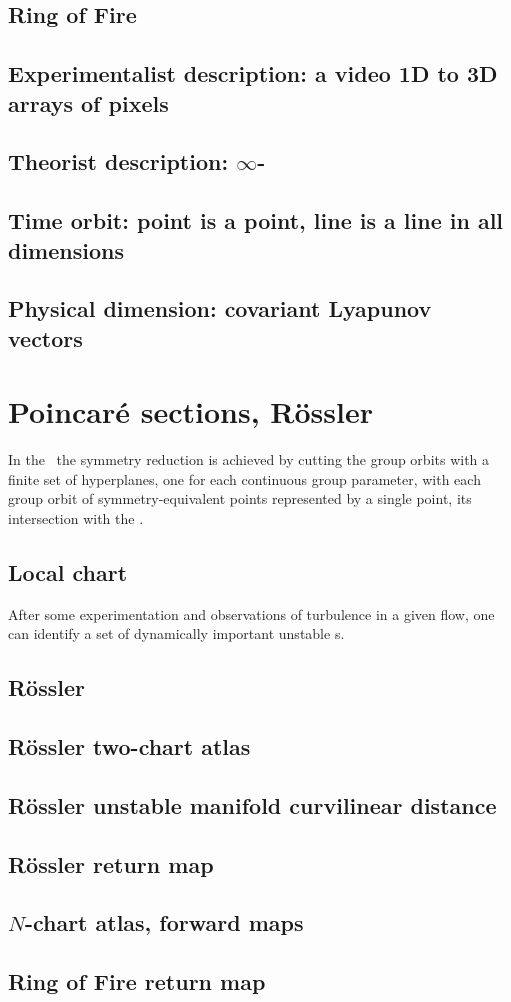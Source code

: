 \subsection{Ring of Fire}
\subsection{Experimentalist description: a video 1D to 3D arrays of pixels}
\subsection{Theorist description: $\infty$-\dmn\ \statesp}
\subsection{Time orbit: point is a point, line is a line in all dimensions}
\label{sect:TimeOrb}

\subsection{Physical dimension: covariant Lyapunov vectors}

\section{Poincar\'e sections, R\"ossler}
\label{s:cut}

In the \mslices\ the symmetry reduction is achieved by cutting the group
orbits with a finite set of hyperplanes, one for each continuous group
parameter, with each group orbit of
symmetry-equivalent points represented by a single point, its
intersection with the \slice.


\subsection{Local chart}
After some experimentation and observations of turbulence in a given
flow, one can identify a set of dynamically important unstable
{\recurrStr s}.

\subsection{R\"ossler {\poincBord}}
\subsection{R\"ossler two-chart atlas}
\subsection{R\"ossler unstable manifold curvilinear distance}
\subsection{R\"ossler return map}
\subsection{$N$-chart atlas, forward maps}
\subsection{Ring of Fire return map}
